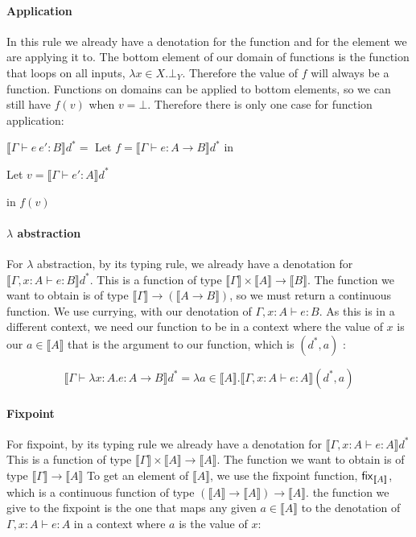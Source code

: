 \paragraph{Application} In this rule we already have a denotation for the function and for the element we are applying it to. The bottom element of our domain of functions is the function that loops on all inputs, $\lambda x \in X. \bot_Y$. Therefore the value of $f$ will always be a function. Functions on domains can be applied to bottom elements, so we can still have $f(v)$ when $v = \bot$. Therefore there is only one case for function application: 

\vspace{0.25cm}

$\llbracket \Gamma \vdash e \ e' : B \rrbracket d^* =$ Let $f = \llbracket \Gamma \vdash e : A \to B \rrbracket d^*$ in 

\hspace{4.5cm} Let $v = \llbracket \Gamma \vdash e' : A \rrbracket d^*$ 

\hspace{7cm} in $f(v)$

\paragraph{$\lambda$ abstraction} For $\lambda$ abstraction, by its typing rule, we already have a denotation for $\llbracket \Gamma , x : A \vdash e : B \rrbracket d^*$. This is a function of type $\llbracket \Gamma \rrbracket \times \llbracket A \rrbracket \to \llbracket B \rrbracket$. The function we want to obtain is of type $\llbracket \Gamma \rrbracket \to  (\llbracket A \to  B \rrbracket)$, so we must return a continuous function. We use currying, with our denotation of $\Gamma, x : A \vdash e : B$. As this is in a different context, we need our function to be in a context where the value of $x$ is our $a \in \llbracket A \rrbracket$ that is the argument to our function, which is $(d^*, a)$ :

\[\llbracket \Gamma \vdash \lambda x : A. e : A \to B \rrbracket d^* = \lambda a \in \llbracket A \rrbracket . \llbracket \Gamma, x : A \vdash e : A \rrbracket(d^*, a)\]
 
\paragraph{Fixpoint} For fixpoint, by its typing rule we already have a denotation for $\llbracket \Gamma , x : A \vdash e : A \rrbracket d^*$ This is a function of type $\llbracket \Gamma \rrbracket \times \llbracket A \rrbracket \to \llbracket A \rrbracket$. The function we want to obtain is of type $\llbracket \Gamma \rrbracket \to  \llbracket A \rrbracket$ To get an element of $\llbracket A \rrbracket$, we use the fixpoint function, $\operatorname{\mathsf{fix}}_{\llbracket A \rrbracket}$, which is a continuous function of type $(\llbracket A \rrbracket \to \llbracket A \rrbracket) \to \llbracket A \rrbracket$. the function we give to the fixpoint is the one that maps any given $a \in \llbracket A \rrbracket$ to the denotation of $ \Gamma , x : A \vdash e : A$ in a context where $a$ is the value of $x$:

